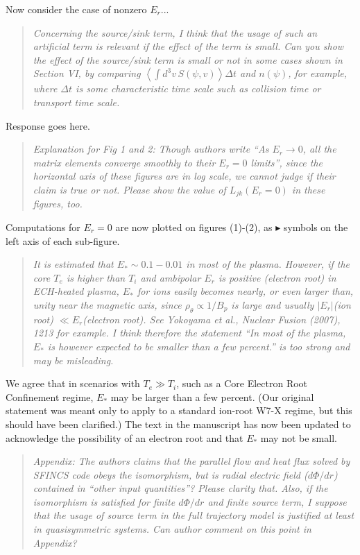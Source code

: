 \documentclass[11pt]{article}
\newcommand{\todo}[1]{{\color{red}#1}}
\newenvironment{referee}{\begin{quote}\it\color{Blue}}{\end{quote}}
\begin{document}
\todo{Now consider the case of nonzero $E_r$...}

\begin{referee}
Concerning the source/sink term, I think that the usage of such an artificial term is relevant if
the effect of the term is small. Can you show the effect of the source/sink term is small or not in
some cases shown in Section VI, by comparing $\left< \int d^3v\, S(\psi,v) \right> \Delta t$ and $n(\psi)$, for example, where
$\Delta t$ is some characteristic time scale such as collision time or transport time scale.
\end{referee}

\todo{Response goes here.}

\begin{referee}
Explanation for Fig 1 and 2: Though authors write ``As $E_r \to 0$, all the matrix elements converge
smoothly to their $E_r = 0$ limits'', since the horizontal axis of these figures are in log scale, we
cannot judge if their claim is true or not. Please show the value of $L_{jk}(E_r=0)$ in these figures,
too.
\end{referee}

Computations for $E_r=0$ are now plotted on figures (1)-(2), as $\blacktriangleright$ symbols on the left axis
of each sub-figure.

\begin{referee}
It is estimated that $E_* \sim 0.1 - 0.01$ in most of the plasma. However, if the core $T_e$ is higher than
$T_i$ and ambipolar $E_r$ is positive (electron root) in ECH-heated plasma, $E_*$ for ions easily becomes
nearly, or even larger than, unity near the magnetic axis, since $\rho_\theta \propto 1/B_p$ is large and usually
$|E_r|$(ion root) $\ll E_r$(electron root). See Yokoyama et al., Nuclear Fusion (2007), 1213 for example.
I think therefore the statement ``In most of the plasma, $E_*$ is however expected to be smaller
than a few percent.'' is too strong and may be misleading.
\end{referee}

We agree that in scenarios with $T_e \gg T_i$, such as a Core Electron Root Confinement regime,
$E_*$ may be larger than a few percent. (Our original statement
was meant only to apply to a standard ion-root W7-X regime,
but this should have been clarified.) The text in the manuscript has now been updated to acknowledge
the possibility of an electron root and that $E_*$ may not be small. 

\begin{referee}
Appendix: The authors claims that the parallel flow and heat flux solved by SFINCS code obeys the
isomorphism, but is radial electric field ($d\Phi/dr$) contained in ``other input quantities''? Please
clarity that. Also, if the isomorphism is satisfied for finite $d\Phi/dr$ and finite source term, I
suppose that the usage of source term in the full trajectory model is justified at least in
quasisymmetric systems. Can author comment on this point in Appendix?
\end{referee}
\end{document}
